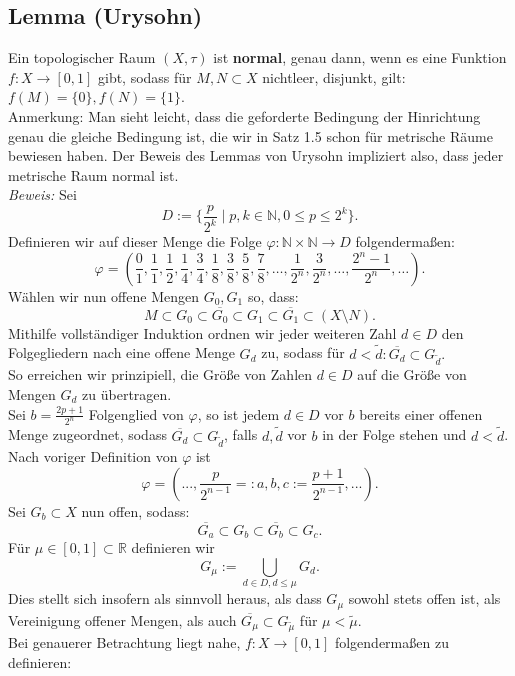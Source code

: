 \documentclass[11pt,leqno]{article}
\newcommand{\R}{\mathbb{R}}
\begin{document}
\subsection{Lemma (Urysohn)}

Ein topologischer Raum $(X, \tau)$ ist \textbf{normal}, genau dann, wenn es eine Funktion $f:X \rightarrow [0,1]$ gibt, sodass für $M,N \subset X$
nichtleer, disjunkt, gilt: $f(M)=\{0\}, f(N)=\{1\}$. \\
Anmerkung: Man sieht leicht, dass die geforderte Bedingung der Hinrichtung genau die gleiche Bedingung ist, die wir in Satz 1.5 schon für 
metrische Räume bewiesen haben. Der Beweis des Lemmas von Urysohn impliziert also, dass jeder metrische Raum normal ist.\\
\textit{Beweis:} Sei
\[D:= \{\frac{p}{2^k} \mid p,k \in \mathbb{N}, 0 \leq p \leq 2^k \}. \]
Definieren wir auf dieser Menge die Folge $\varphi: \mathbb{N} \times \mathbb{N} \rightarrow D$ folgendermaßen:
\[\varphi = (\frac{0}{1}, \frac{1}{1}, \frac{1}{2}, \frac{1}{4}, \frac{3}{4}, \frac{1}{8}, \frac{3}{8}, \frac{5}{8}, \frac{7}{8}, \dots, 
\frac{1}{2^n}, \frac{3}{2^n}, \dots, \frac{2^n-1}{2^n}, \dots).\]
Wählen wir nun offene Mengen $G_0, G_1$ so, dass: 
\[M \subset G_0 \subset \overline{G_0} \subset G_1 \subset \overline{G_1} \subset (X \setminus N). \]
Mithilfe vollständiger Induktion ordnen wir jeder weiteren Zahl $d \in D$ den Folgegliedern nach eine offene Menge $G_d$ zu, sodass für 
$d < \tilde{d}: \overline{G_d} \subset G_{\tilde{d}}.$ \\
So erreichen wir prinzipiell, die Größe von Zahlen $d \in D$ auf \glqq die Größe von Mengen $G_d$\grqq{} zu übertragen.\\
Sei $b = \frac{2p+1}{2^n}$ Folgenglied von $\varphi$, so ist jedem $d \in D$ vor $b$ bereits einer offenen Menge zugeordnet, sodass 
$\overline{G_d} \subset G_{\tilde{d}}$, falls $d, \tilde{d}$ vor $b$ in der Folge stehen und $d < \tilde{d}$. \\
Nach voriger Definition von $\varphi$ ist 
\[\varphi = ( ..., \frac{p}{2^{n-1}}=:a, b, c:=\frac{p+1}{2^{n-1}},...). \]
Sei $G_b \subset X$ nun offen, sodass:
\[\overline{G_a} \subset G_b \subset \overline{G_b} \subset G_c.\]
Für $\mu \in [0,1]\subset \R$ definieren wir \[G_\mu := \bigcup_{d \in D, d \leq \mu}G_d .\] 
Dies stellt sich insofern als sinnvoll heraus, als dass $G_\mu$ sowohl stets offen ist, als Vereinigung offener Mengen, als auch $\overline{G_\mu}
\subset G_{\tilde{\mu}}$ für $\mu <\tilde{\mu}$.\\
Bei genauerer Betrachtung liegt nahe, $f:X \rightarrow [0,1]$ folgendermaßen zu definieren:
\end{document}
